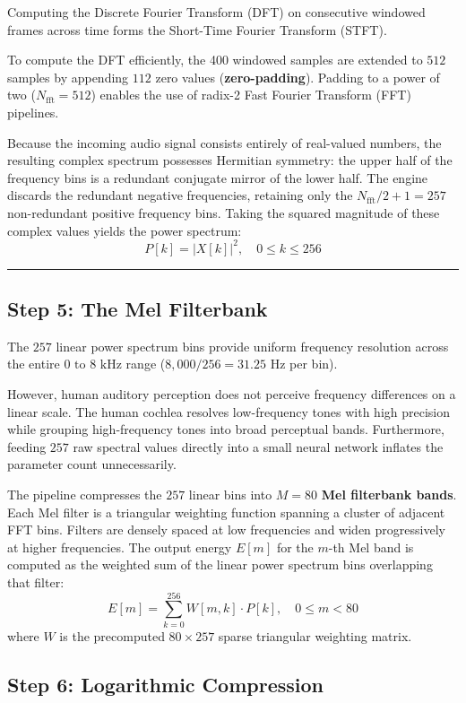 \documentclass[11pt,a4paper]{article}
\begin{document}
Computing the Discrete Fourier Transform (DFT) on consecutive windowed frames across time forms the Short-Time Fourier Transform (STFT). 

To compute the DFT efficiently, the 400 windowed samples are extended to $512$ samples by appending $112$ zero values (\textbf{zero-padding}). Padding to a power of two ($N_{\text{fft}} = 512$) enables the use of radix-2 Fast Fourier Transform (FFT) pipelines.

Because the incoming audio signal consists entirely of real-valued numbers, the resulting complex spectrum possesses Hermitian symmetry: the upper half of the frequency bins is a redundant conjugate mirror of the lower half. The engine discards the redundant negative frequencies, retaining only the $N_{\text{fft}} / 2 + 1 = 257$ non-redundant positive frequency bins. Taking the squared magnitude of these complex values yields the power spectrum:
$$P[k] = |X[k]|^2, \quad 0 \le k \le 256$$

\smallskip
\hrule
\smallskip

\subsection*{Step 5: The Mel Filterbank}

The $257$ linear power spectrum bins provide uniform frequency resolution across the entire $0\text{ to }8\text{ kHz}$ range ($8{,}000 / 256 = 31.25\text{ Hz}$ per bin). 

However, human auditory perception does not perceive frequency differences on a linear scale. The human cochlea resolves low-frequency tones with high precision while grouping high-frequency tones into broad perceptual bands. Furthermore, feeding $257$ raw spectral values directly into a small neural network inflates the parameter count unnecessarily.

The pipeline compresses the $257$ linear bins into $M = 80$ \textbf{Mel filterbank bands}. Each Mel filter is a triangular weighting function spanning a cluster of adjacent FFT bins. Filters are densely spaced at low frequencies and widen progressively at higher frequencies. The output energy $E[m]$ for the $m$-th Mel band is computed as the weighted sum of the linear power spectrum bins overlapping that filter:
$$E[m] = \sum_{k=0}^{256} W[m, k] \cdot P[k], \quad 0 \le m < 80$$
where $W$ is the precomputed $80 \times 257$ sparse triangular weighting matrix.

\clearpage

\subsection*{Step 6: Logarithmic Compression}
\end{document}
